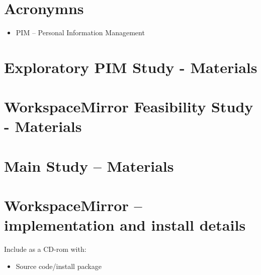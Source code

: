 \section{Acronymns}
	\begin{itemize}
		\item PIM -- Personal Information Management
	\end{itemize}

\section{Exploratory PIM Study -  Materials}

\section{WorkspaceMirror Feasibility Study -  Materials}

\section{Main Study --  Materials}

\section{WorkspaceMirror -- implementation and install details}

Include as a CD-rom with:
\begin{itemize}
	\item Source code/install package
\end{itemize}









